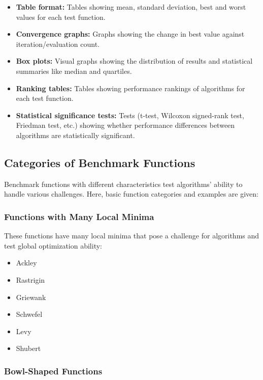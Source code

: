 \begin{itemize}
    \item \textbf{Table format:} Tables showing mean, standard deviation, best and worst values for each test function.
    
    \item \textbf{Convergence graphs:} Graphs showing the change in best value against iteration/evaluation count.
    
    \item \textbf{Box plots:} Visual graphs showing the distribution of results and statistical summaries like median and quartiles.
    
    \item \textbf{Ranking tables:} Tables showing performance rankings of algorithms for each test function.
    
    \item \textbf{Statistical significance tests:} Tests (t-test, Wilcoxon signed-rank test, Friedman test, etc.) showing whether performance differences between algorithms are statistically significant.
\end{itemize}

\subsection{Categories of Benchmark Functions}

Benchmark functions with different characteristics test algorithms' ability to handle various challenges. Here, basic function categories and examples are given:

\subsubsection{Functions with Many Local Minima}

These functions have many local minima that pose a challenge for algorithms and test global optimization ability:

\begin{itemize}
    \item Ackley
    \item Rastrigin
    \item Griewank
    \item Schwefel
    \item Levy
    \item Shubert
\end{itemize}

\subsubsection{Bowl-Shaped Functions}

